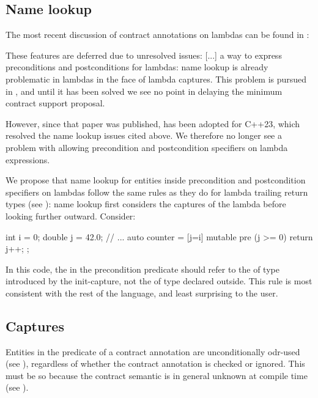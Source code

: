 \subsection{Name lookup}

The most recent discussion of contract annotations on lambdas can be found in \cite{P2388R4}:

\pagebreak

\begin{adjustwidth}{0.5cm}{0.5cm}
These features are deferred due to unresolved issues: [...] a way to express preconditions and postconditions for lambdas: name lookup is already problematic in lambdas in the face of lambda captures. This problem is pursued in \cite{P2036R1}, and until it has been solved we see no point in delaying the minimum contract support proposal.
\end{adjustwidth}

However, since that paper was published, \cite{P2036R3} has been adopted for C++23, which resolved the name lookup issues cited above. We therefore no longer see a problem with allowing precondition and postcondition specifiers on lambda expressions.

We propose that name lookup for entities inside precondition and postcondition specifiers on lambdas follow the same rules as they do for lambda trailing return types (see \cite{P2036R3}): name lookup first considers the captures of the lambda before looking further outward. Consider:

\begin{codeblock}
int i = 0;
double j = 42.0;
// ...
auto counter = [j=i] mutable pre (j >= 0) {
  return j++;
};
\end{codeblock}

In this code, the  in the precondition predicate should refer to the  of type  introduced by the init-capture, not the  of type  declared outside. This rule is most consistent with the rest of the language, and least surprising to the user.

\subsection{Captures}

Entities in the predicate of a contract annotation are unconditionally odr-used (see \cite{P2900R2}), regardless of whether the contract annotation is checked or ignored. This must be so because the contract semantic is in general unknown at compile time (see \cite{P2877R0}).

